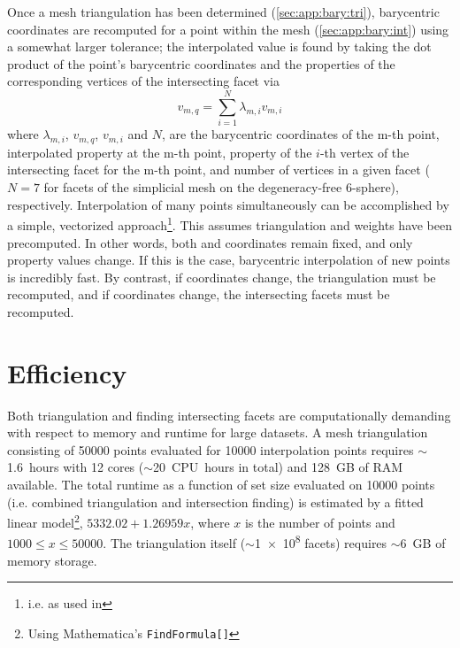 \documentclass[final,12pt]{elsarticle}
\begin{document}
Once a mesh triangulation has been determined (\cref{sec:app:bary:tri}), barycentric coordinates are recomputed for a \outpt{} point within the \inpt{} mesh (\cref{sec:app:bary:int}) using a somewhat larger tolerance; the interpolated value is found by taking the dot product of the \outpt{} point's barycentric coordinates and the properties of the corresponding vertices of the intersecting facet via
\begin{equation}
	\label{eq:bary-interp}
	v_{m,q}=\underset{i=1}{\overset{N}{\sum }}\lambda _{m,i} v_{m,i}
\end{equation}
where $\lambda_{m,i}$, $v_{m,q}$, $v_{m,i}$ and $N$, are the barycentric coordinates of the m-th \outpt{} point, interpolated property at the m-th \outpt{} point, property of the $i$-th vertex of the intersecting facet for the m-th \outpt{} point, and number of vertices in a given facet ($N = 7$ for facets of the simplicial mesh on the degeneracy-free 6-sphere), respectively. Interpolation of many \outpt{} points simultaneously can be accomplished by a simple, vectorized approach\footnote{i.e.  as used in }. This assumes triangulation and weights have been precomputed. In other words, both \inpt{} and \outpt{} coordinates remain fixed, and only \inpt{} property values change. If this is the case, barycentric interpolation of new points is incredibly fast. By contrast, if \inpt{} coordinates change, the triangulation must be recomputed, and if \outpt{} coordinates change, the intersecting facets must be recomputed.

\section{Efficiency}
Both triangulation and finding intersecting facets are computationally demanding with respect to memory and runtime for large datasets. A mesh triangulation consisting of \num{50000} points evaluated for \num{10000} interpolation points requires $\sim$1.6~hours with 12 cores ($\sim$20~CPU~hours in total) and \num{128}~GB of RAM available. The total runtime as a function of set size evaluated on \num{10000} \outpt{} points (i.e. combined triangulation and intersection finding) is estimated by a fitted linear model\footnote{Using Mathematica's \texttt{FindFormula[]} }, $5332.02 + 1.26959 x$, where $x$ is the number of points and $1000\leq x \leq 50000$. The triangulation itself ($\sim$\num{1e8} facets) requires $\sim$6~GB of memory storage.
\end{document}
